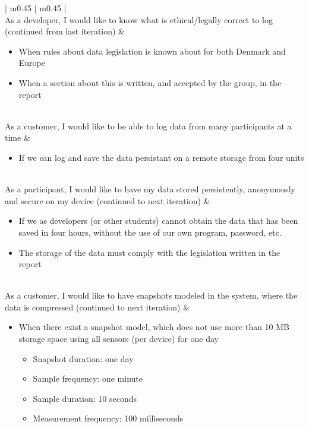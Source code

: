 \begin{center}
\begin{longtable}{| m{} | m{} |}
	 \\ \hline
	As a developer, I would like to know what is ethical/legally correct to log (continued from last iteration) & 
	\begin{itemize}[noitemsep,topsep=0pt,parsep=0pt,partopsep=0pt]
		\item When rules about data legislation is known about for both Denmark and Europe
		\item When a section about this is written, and accepted by the group, in the report
	\end{itemize} \\ \hline
	As a customer, I would like to be able to log data from many participants at a time & 
	\begin{itemize}[noitemsep,topsep=0pt,parsep=0pt,partopsep=0pt]
	 	\item If we can log and save the data persistant on a remote storage from four units
	 \end{itemize} \\ \hline
	As a participant, I would like to have my data stored persistently, anonymously and secure on my device (continued to next iteration)  & 
	\begin{itemize}[noitemsep,topsep=0pt,parsep=0pt,partopsep=0pt]
	 	\item If we as developers (or other students) cannot obtain the data that has been saved in four hours, without the use of our own program, password, etc.
	 	\item The storage of the data must comply with the legislation written in the report
	 \end{itemize} \\ \hline
	As a customer, I would like to have snapshots modeled in the system, where the data is compressed (continued to next iteration) & 
	\begin{itemize}[noitemsep,topsep=0pt,parsep=0pt,partopsep=0pt]
	 	\item When there exist a snapshot model, which does not use more than 10 MB storage space using all sensors (per device) for one day
	 		\begin{itemize}[noitemsep,topsep=0pt,parsep=0pt,partopsep=0pt]
	 			\item Snapshot duration: one day
	 			\item Sample frequency: one minute
	 			\item Sample duration: 10 seconds
	 			\item Measurement frequency: 100 milliseconds
	 		\end{itemize}
	 \end{itemize} \\ \hline


\end{longtable}
\end{center}
